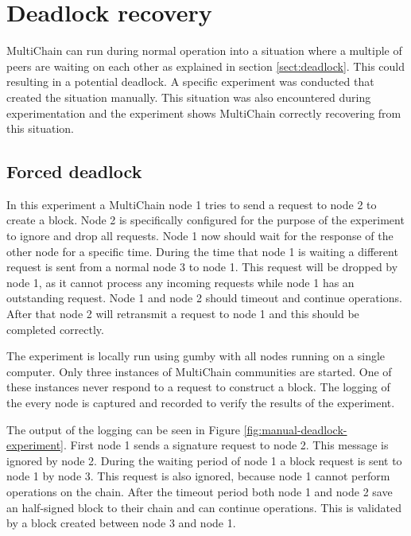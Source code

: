 \section{Deadlock recovery}
\label{sect:deadlock-exp}
MultiChain can run during normal operation into a situation
where a multiple of peers are waiting on each other as explained in section \ref{sect:deadlock}.
This could resulting in a potential deadlock.
A specific experiment was conducted that created the situation manually.
This situation was also encountered during experimentation
and the experiment shows MultiChain correctly recovering from this situation.

\subsection{Forced deadlock}
In this experiment a MultiChain node 1 tries to send a request to node 2 to create a block.
Node 2 is specifically configured for the purpose of the experiment
to ignore and drop all requests.
Node 1 now should wait for the response of the other node for a specific time.
During the time that node 1 is waiting a different request is sent from a normal node 3 to node 1.
This request will be dropped by node 1,
as it cannot process any incoming requests while node 1 has an outstanding request.
Node 1 and node 2 should timeout and continue operations.
After that node 2 will retransmit a request to node 1 and this should be completed correctly.

The experiment is locally run using gumby with all nodes running on a single computer.
Only three instances of MultiChain communities are started.
One of these instances never respond to a request to construct a block.
The logging of the every node is captured and recorded to verify the results of the experiment.

The output of the logging can be seen in Figure \ref{fig:manual-deadlock-experiment}.
First node 1 sends a signature request to node 2.
This message is ignored by node 2.
During the waiting period of node 1 a block request is sent to node 1 by node 3.
This request is also ignored, because node 1 cannot perform operations on the chain.
After the timeout period both node 1 and node 2 save an half-signed block to their chain
and can continue operations.
This is validated by a block created between node 3 and node 1.

